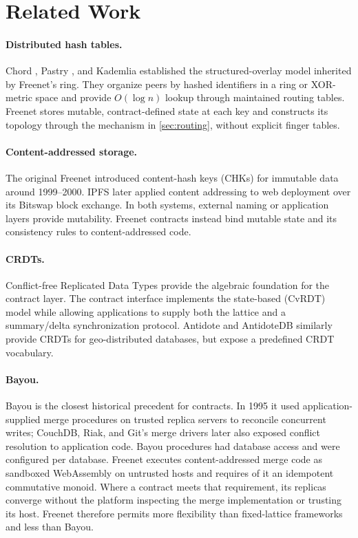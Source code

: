 \section{Related Work}
\label{sec:related}

\paragraph{Distributed hash tables.} Chord \citep{stoica2001chord}, Pastry \citep{rowstron2001pastry}, and Kademlia \citep{maymounkov2002kademlia} established the structured-overlay model inherited by Freenet's ring. They organize peers by hashed identifiers in a ring or XOR-metric space and provide $O(\log n)$ lookup through maintained routing tables. Freenet stores mutable, contract-defined state at each key and constructs its topology through the mechanism in \cref{sec:routing}, without explicit finger tables.

\paragraph{Content-addressed storage.} The original Freenet \citep{clarke2001freenet} introduced content-hash keys (CHKs) for immutable data around 1999--2000. IPFS \citep{benet2014ipfs} later applied content addressing to web deployment over its Bitswap block exchange. In both systems, external naming or application layers provide mutability. Freenet contracts instead bind mutable state and its consistency rules to content-addressed code.

\paragraph{CRDTs.} Conflict-free Replicated Data Types \citep{shapiro2011crdt} provide the algebraic foundation for the contract layer. The contract interface implements the state-based (CvRDT) model while allowing applications to supply both the lattice and a summary/delta synchronization protocol. Antidote and AntidoteDB \citep{akkoorath2016cure} similarly provide CRDTs for geo-distributed databases, but expose a predefined CRDT vocabulary.

\paragraph{Bayou.} Bayou \citep{terry1995bayou} is the closest historical precedent for contracts. In 1995 it used application-supplied merge procedures on trusted replica servers to reconcile concurrent writes; CouchDB, Riak, and Git's merge drivers later also exposed conflict resolution to application code. Bayou procedures had database access and were configured per database. Freenet executes content-addressed merge code as sandboxed WebAssembly on untrusted hosts and requires of it an idempotent commutative monoid. Where a contract meets that requirement, its replicas converge without the platform inspecting the merge implementation or trusting its host. Freenet therefore permits more flexibility than fixed-lattice frameworks and less than Bayou.

